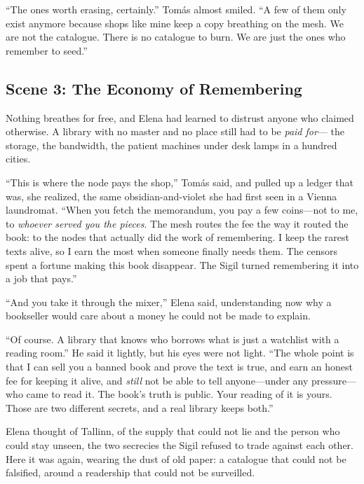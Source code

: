 ``The ones worth erasing, certainly.'' Tomás almost smiled. ``A few of them only
exist anymore because shops like mine keep a copy breathing on the mesh. We are not
the catalogue. There is no catalogue to burn. We are just the ones who remember to
seed.''

\hypertarget{scene-3-the-economy-of-remembering}{%
\subsection{Scene 3: The Economy of
Remembering}\label{scene-3-the-economy-of-remembering}}

Nothing breathes for free, and Elena had learned to distrust anyone who claimed
otherwise. A library with no master and no place still had to be \emph{paid for}---
the storage, the bandwidth, the patient machines under desk lamps in a hundred
cities.

``This is where the node pays the shop,'' Tomás said, and pulled up a ledger that
was, she realized, the same obsidian-and-violet she had first seen in a Vienna
laundromat. ``When you fetch the memorandum, you pay a few coins---not to me, to
\emph{whoever served you the pieces}. The mesh routes the fee the way it routed the
book: to the nodes that actually did the work of remembering. I keep the rarest
texts alive, so I earn the most when someone finally needs them. The censors
spent a fortune making this book disappear. The Sigil turned remembering it into a
job that pays.''

``And you take it through the mixer,'' Elena said, understanding now why a
bookseller would care about a money he could not be made to explain.

``Of course. A library that knows who borrows what is just a watchlist with a
reading room.'' He said it lightly, but his eyes were not light. ``The whole point
is that I can sell you a banned book and prove the text is true, and earn an honest
fee for keeping it alive, and \emph{still} not be able to tell anyone---under any
pressure---who came to read it. The book's truth is public. Your reading of it is
yours. Those are two different secrets, and a real library keeps both.''

Elena thought of Tallinn, of the supply that could not lie and the person who could
stay unseen, the two secrecies the Sigil refused to trade against each other. Here
it was again, wearing the dust of old paper: a catalogue that could not be
falsified, around a readership that could not be surveilled.

